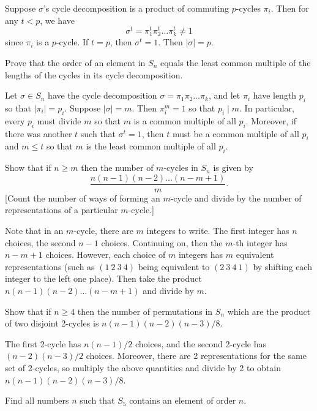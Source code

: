 \begin{problems}
\begin{sol}
        Suppose $\sigma$'s cycle decomposition is a product of commuting $p$-cycles $\pi_i$. Then for any $t < p$, we have
        $$\sigma^t = \pi_1^t\pi_2^t \ldots \pi_k^t \neq 1$$
        since $\pi_i$ is a $p$-cycle. If $t = p$, then $\sigma^t = 1$. Then $|\sigma| = p$.
    \end{sol}
    \item Prove that the order of an element in $S_n$ equals the least common multiple of the lengths of the cycles in its cycle decomposition.
    \begin{sol}
        Let $\sigma \in S_n$ have the cycle decomposition $\sigma = \pi_1\pi_2 \ldots \pi_k$, and let $\pi_i$ have length $p_i$ so that $|\pi_i| = p_i$. Suppose $|\sigma| = m$. Then $\pi_i^m = 1$ so that $p_i \mid m$. In particular, every $p_i$ must divide $m$ so that $m$ is a common multiple of all $p_i$. Moreover, if there was another $t$ such that $\sigma^t = 1$, then $t$ must be a common multiple of all $p_i$ and $m \leq t$ so that $m$ is the least common multiple of all $p_i$.
    \end{sol}
    \item Show that if $n \ge m$ then the number of $m$-cycles in $S_n$ is given by
    $$\frac{n(n-1)(n-2)\dots(n-m+1)}{m}.$$
    [Count the number of ways of forming an $m$-cycle and divide by the number of representations of a particular $m$-cycle.]
    \begin{sol}
        Note that in an $m$-cycle, there are $m$ integers to write. The first integer has $n$ choices, the second $n - 1$ choices. Continuing on, then the $m$-th integer has $n - m + 1$ choices. However, each choice of $m$ integers has $m$ equivalent representations (such as $(1\ 2\ 3\ 4)$ being equivalent to $(2\ 3\ 4\ 1)$ by shifting each integer to the left one place). Then take the product $n(n - 1)(n - 2) \ldots (n - m + 1)$ and divide by $m$.
    \end{sol}
    \item Show that if $n \geq 4$ then the number of permutations in $S_n$ which are the product of two disjoint 2-cycles is $n(n - 1)(n - 2)(n - 3)/8$.
    \begin{sol}
        The first 2-cycle has $n(n - 1)/2$ choices, and the second 2-cycle has $(n - 2)(n - 3)/2$ choices. Moreover, there are 2 representations for the same set of 2-cycles, so multiply the above quantities and divide by 2 to obtain $n(n - 1)(n - 2)(n - 3)/8$.
    \end{sol}
    \item Find all numbers $n$ such that $S_5$ contains an element of order $n$.

\end{problems}
